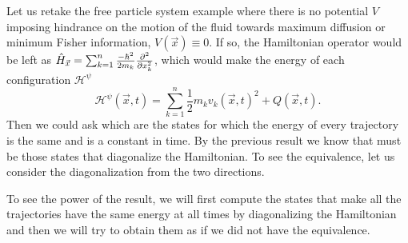 \documentclass[11pt, a4paper]{article} %
\newcommand{\h}{\mathcal{H}}
\begin{document}
Let us retake the free particle system example where there is no potential $V$ imposing hindrance on the motion of the fluid towards maximum diffusion or minimum Fisher information, $V(\vec{x})\equiv 0$. If so, the Hamiltonian operator would be left as $\hat{H}_{\vec{x}}=\sum_{k=1}^n\frac{-\hbar^2}{2m_k}\pdv[2]{}{x_k}$, which would make the energy of each configuration $\h^\psi$
\begin{equation}
\h^\psi(\vec{x},t)=\sum_{k=1}^n\frac{1}{2}m_kv_k(\vec{x},t)^2+Q(\vec{x},t).
\end{equation}
Then we could ask which are the states for which the energy of every trajectory is the same and is a constant in time. By the previous result we know that must be those states that diagonalize the Hamiltonian. To see the equivalence, let us consider the diagonalization from the two directions.

To see the power of the result, we will first compute the states that make all the trajectories have the same energy at all times by diagonalizing the Hamiltonian and then we will try to obtain them as if we did not have the equivalence.
\end{document}
